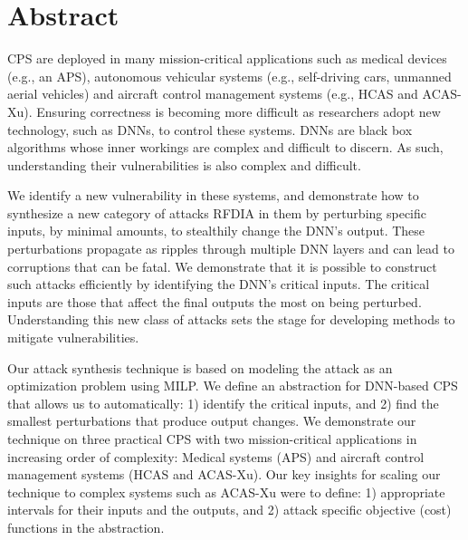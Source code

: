 
\chapter{Abstract}

\ac{CPS} are deployed in many mission-critical applications such as medical devices (e.g., an \ac{APS}), autonomous vehicular systems (e.g., self-driving cars, unmanned aerial vehicles) and aircraft control management systems (e.g.,  \ac{HCAS} and \ac{ACAS-Xu}). 
Ensuring correctness is becoming more difficult as researchers adopt new technology, such as \ac{DNN}s, to control these systems. 
\ac{DNN}s are black box algorithms whose inner workings are complex and difficult to discern.
As such, understanding their vulnerabilities is also complex and difficult. 

We identify a new vulnerability in these systems, and demonstrate how to synthesize a new category of attacks \ac{RFDIA} in them by perturbing specific inputs, by minimal amounts, to stealthily change the \ac{DNN}'s output. 
 These  perturbations propagate as ripples through multiple \ac{DNN} layers and can lead to corruptions that can be fatal. 
We demonstrate that it is possible  to construct such attacks efficiently by identifying the \ac{DNN}'s critical inputs. 
The critical inputs are those that  affect the final outputs the most on being perturbed. 
Understanding this new class of attacks sets the stage for developing methods to mitigate vulnerabilities. 

Our attack synthesis technique is based on modeling the attack as an optimization problem using \ac{MILP}.
We define an abstraction for \ac{DNN}-based \ac{CPS} that allows us to automatically: 1) identify the critical inputs, and 2) find the smallest perturbations that produce output changes. 
We demonstrate our technique on three practical \ac{CPS} with two mission-critical applications in increasing order of complexity: Medical systems (\ac{APS}) and aircraft control management systems (\ac{HCAS} and \ac{ACAS-Xu}). 
Our key insights for scaling our technique to complex systems such as \ac{ACAS-Xu} were to define: 1) appropriate intervals for their inputs and the outputs, and 2) attack specific objective (cost) functions in the abstraction.  
 



